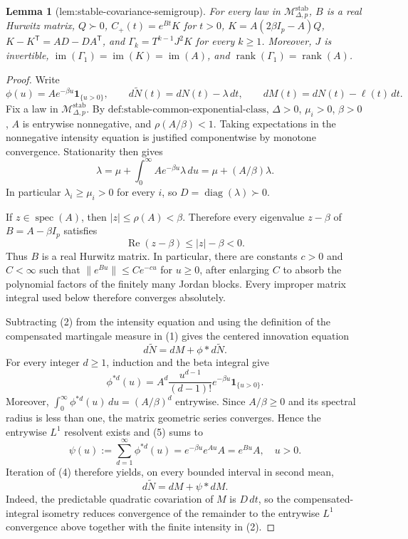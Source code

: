 \documentclass{article}
\newtheorem{lemma}{Lemma}
\begin{document}
\begin{lemma}[lem:stable-covariance-semigroup]\label{lem:stable-covariance-semigroup}
For every law in \(\mathcal M_{\Delta,p}^{\mathrm{stab}}\), \(B\) is a real Hurwitz matrix, \(Q\succ0\), \(C_{+}(t)=e^{Bt}K\) for \(t>0\), \(K=A(2\beta I_p-A)Q\), \(K-K^{\mathsf T}=AD-DA^{\mathsf T}\), and \(\Gamma_k=T^{k-1}J^2K\) for every \(k\geq1\). Moreover, \(J\) is invertible, \(\operatorname{im}(\Gamma_1)=\operatorname{im}(K)=\operatorname{im}(A)\), and \(\operatorname{rank}(\Gamma_1)=\operatorname{rank}(A)\).
\end{lemma}
\begin{proof}
Write
\[
 \phi(u)=Ae^{-\beta u}\mathbf 1_{\{u>0\}},\qquad
 d\widetilde N(t)=dN(t)-\lambda\,dt,\qquad
 dM(t)=dN(t)-\ell(t)\,dt.
\tag{1}
\]
Fix a law in \(\mathcal M_{\Delta,p}^{\mathrm{stab}}\).  By \(\text{def:stable-common-exponential-class}\), \(\Delta>0\), \(\mu_i>0\), \(\beta>0\), \(A\) is entrywise nonnegative, and \(\rho(A/\beta)<1\).  Taking expectations in the nonnegative intensity equation is justified componentwise by monotone convergence.  Stationarity then gives
\[
 \lambda=\mu+\int_0^\infty Ae^{-\beta u}\lambda\,du
 =\mu+(A/\beta)\lambda.
\tag{2}
\]
In particular \(\lambda_i\geq\mu_i>0\) for every \(i\), so
\(D=\operatorname{diag}(\lambda)\succ0\).

If \(z\in\operatorname{spec}(A)\), then \(|z|\leq\rho(A)<\beta\).  Therefore every eigenvalue \(z-\beta\) of \(B=A-\beta I_p\) satisfies
\[
 \operatorname{Re}(z-\beta)\leq |z|-\beta<0.
\tag{3}
\]
Thus \(B\) is a real Hurwitz matrix.  In particular, there are constants \(c>0\) and \(C<\infty\) such that \(\|e^{Bu}\|\leq Ce^{-cu}\) for \(u\geq0\), after enlarging \(C\) to absorb the polynomial factors of the finitely many Jordan blocks.  Every improper matrix integral used below therefore converges absolutely.

Subtracting (2) from the intensity equation and using the definition of the compensated martingale measure in (1) gives the centered innovation equation
\[
 d\widetilde N=dM+\phi*d\widetilde N.
\tag{4}
\]
For every integer \(d\geq1\), induction and the beta integral give
\[
 \phi^{*d}(u)
 =A^d\frac{u^{d-1}}{(d-1)!}e^{-\beta u}\mathbf 1_{\{u>0\}}.
\tag{5}
\]
Moreover, \(\int_0^\infty\phi^{*d}(u)\,du=(A/\beta)^d\) entrywise.  Since \(A/\beta\geq0\) and its spectral radius is less than one, the matrix geometric series converges.  Hence the entrywise \(L^1\) resolvent exists and (5) sums to
\[
 \psi(u):=\sum_{d=1}^{\infty}\phi^{*d}(u)
 =e^{-\beta u}e^{Au}A=e^{Bu}A,\quad u>0.
\tag{6}
\]
Iteration of (4) therefore yields, on every bounded interval in second mean,
\[
 d\widetilde N=dM+\psi*dM.
\tag{7}
\]
Indeed, the predictable quadratic covariation of \(M\) is \(D\,dt\), so the compensated-integral isometry reduces convergence of the remainder to the entrywise \(L^1\) convergence above together with the finite intensity in (2).


\end{proof}
\end{document}
